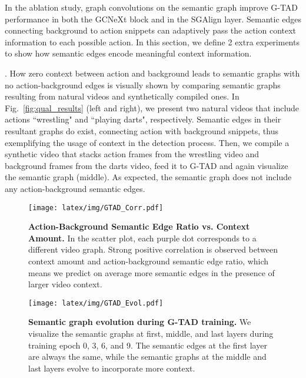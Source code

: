 \documentclass[10pt,twocolumn,letterpaper]{article}
\begin{document}
In the ablation study, graph convolutions on the semantic graph improve G-TAD performance in both the GCNeXt block and in the SGAlign layer. Semantic edges connecting background to action snippets can adaptively pass the action context information to each possible action. In this section, we define 2 extra experiments to show how semantic edges encode meaningful context information.

. How zero context between action and background leads to semantic graphs with no action-background edges is visually shown by comparing semantic graphs resulting from natural videos and synthetically compiled ones.
In Fig.~\ref{fig:qual_results} (left and right), we present two natural videos that  include actions ``wrestling" and ``playing darts", respectively. Semantic edges in their resultant graphs do exist, connecting action with background snippets, thus exemplifying the usage of context in the detection process.
Then, we compile a synthetic video that stacks action frames from the wrestling video and background frames from the darts video, feed it to G-TAD and again visualize the semantic graph (middle). As expected, the semantic graph does not include any action-background semantic edges.



\begin{figure}[!ht]
    \centering
    \texttt{[image: latex/img/GTAD\_Corr.pdf]}
    \caption{\textbf{Action-Background Semantic Edge Ratio vs. Context Amount.} In the scatter plot, each purple dot corresponds to a different video graph. 
Strong positive correlation is observed between context amount and action-background  semantic  edge ratio, which means we predict on average more semantic edges in the presence of larger video context.
}
    \label{fig:ratio}
\end{figure}


\begin{figure}[!ht]
    \centering
    \texttt{[image: latex/img/GTAD\_Evol.pdf]}
    \caption{\textbf{Semantic graph evolution during G-TAD training.} We visualize the semantic graphs at first, middle, and last layers during training epoch 0, 3, 6, and 9. The semantic edges at the first layer are always the same, while the semantic graphs at the middle and last layers evolve to incorporate more context.}\vspace{-6pt}
    \label{fig:evol}
\end{figure}
\end{document}
